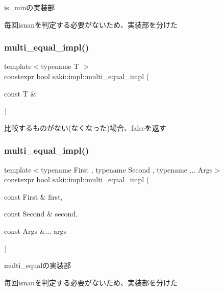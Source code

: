 is\+\_\+minの実装部 

毎回isnanを判定する必要がないため、実装部を分けた \mbox{\label{namespacesaki_1_1impl_ac271639854025a923addee4879780f96}} 
\subsubsection{\texorpdfstring{multi\+\_\+equal\+\_\+impl()}{multi\_equal\_impl()}\hspace{0.1cm}{\footnotesize\ttfamily [1/2]}}
{\footnotesize\ttfamily template$<$typename T $>$ \\
constexpr bool saki\+::impl\+::multi\+\_\+equal\+\_\+impl (\begin{DoxyParamCaption}\item[{const T \&}]{ }\end{DoxyParamCaption})}



比較するものがない(なくなった)場合、falseを返す 

\mbox{\label{namespacesaki_1_1impl_afd0543c20cbd7373bceba87c2af5b3de}} 
\subsubsection{\texorpdfstring{multi\+\_\+equal\+\_\+impl()}{multi\_equal\_impl()}\hspace{0.1cm}{\footnotesize\ttfamily [2/2]}}
{\footnotesize\ttfamily template$<$typename First , typename Second , typename ... Args$>$ \\
constexpr bool saki\+::impl\+::multi\+\_\+equal\+\_\+impl (\begin{DoxyParamCaption}\item[{const First \&}]{first,  }\item[{const Second \&}]{second,  }\item[{const Args \&...}]{args }\end{DoxyParamCaption})}



multi\+\_\+equalの実装部 

毎回isnanを判定する必要がないため、実装部を分けた 
